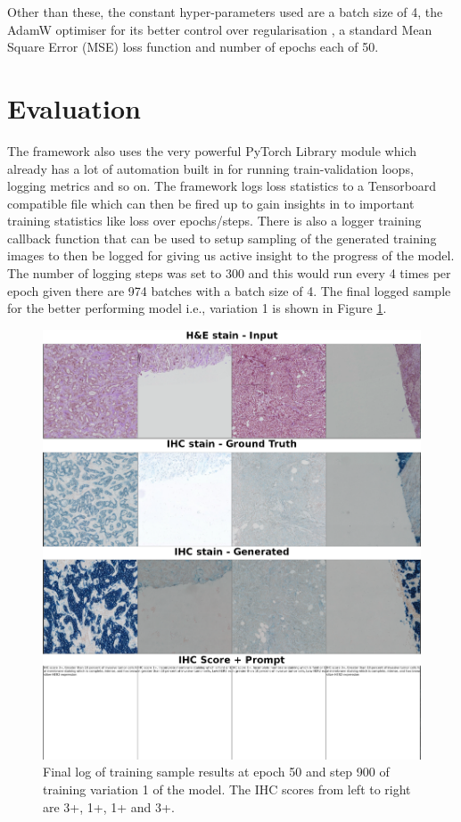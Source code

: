 Other than these, the constant hyper-parameters used are a batch size of 4, the AdamW optimiser for its better control over regularisation \parencite{Loshchilov2017DecoupledRegularization}, a standard Mean Square Error (MSE) loss function and number of epochs each of 50. 

\section{Evaluation}

The framework also uses the very powerful PyTorch Library module which already has a lot of automation built in for running train-validation loops, logging metrics and so on. The framework logs loss statistics to a Tensorboard compatible file which can then be fired up to gain insights in to important training statistics like loss over epochs/steps. There is also a logger training callback function that can be used to setup sampling of the generated training images to then be logged for giving us active insight to the progress of the model. The number of logging steps was set to 300 and this would run every 4 times per epoch given there are 974 batches with a batch size of 4. The final logged sample for the better performing model i.e., variation 1 is shown in Figure \ref{fig:best-train-log}.

\begin{figure}[ht]
    \centering
    \includegraphics[width=0.75\linewidth]{4_ResearchMethodology/figures/v4-training-e49-b900-Result.png}
    \caption[Final log of training sample results]{Final log of training sample results at epoch 50 and step 900 of training variation 1 of the model. The IHC scores from left to right are 3+, 1+, 1+ and 3+.}
    \label{fig:best-train-log}
\end{figure}

